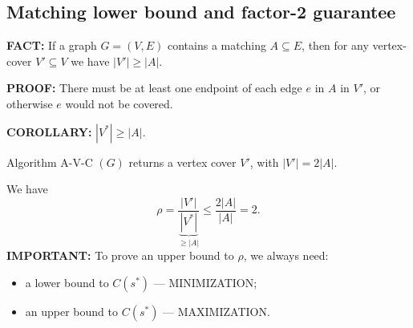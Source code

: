 \subsection{Matching lower bound and factor-2 guarantee}
\begin{notesresult}
\textbf{FACT:} If a graph $G=(V,E)$ contains a matching $A\subseteq E$, then for any vertex-cover $V'\subseteq V$ we have $|V'|\geq|A|$.
\end{notesresult}

\textbf{PROOF:} There must be at least one endpoint of each edge $e$ in $A$ in $V'$, or otherwise $e$ would not be covered.
\begin{notesresult}
\textbf{COROLLARY:} $|V^*|\geq|A|$.
\end{notesresult}

Algorithm A-V-C $(G)$ returns a vertex cover $V'$, with $|V'|=2|A|$.

We have
\[\rho=\frac{|V'|}{\underbrace{|V^*|}_{\geq|A|}}\leq\frac{2|A|}{|A|}=2.\]
\textbf{IMPORTANT:} To prove an upper bound to $\rho$, we always need:
\begin{itemize}
\item a lower bound to $C(s^*)$ --- MINIMIZATION;
\item an upper bound to $C(s^*)$ --- MAXIMIZATION.
\end{itemize}
